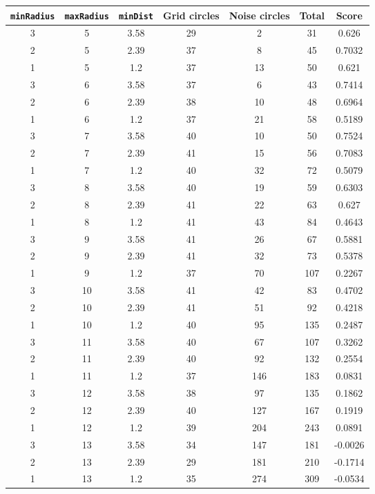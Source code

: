 \documentclass[letterpaper, 12pt]{article}
\begin{document}
\begin{longtable}{|c|c|c|c|c|c|c|}
\hline
\textbf{\texttt{minRadius}} & \textbf{\texttt{maxRadius}} & \textbf{\texttt{minDist}} & \textbf{Grid circles} & \textbf{Noise circles} & \textbf{Total} & \textbf{Score} \\
\hline
3 & 5 & 3.58 & 29 & 2 & 31 & 0.626 \\
\hline
2 & 5 & 2.39 & 37 & 8 & 45 & 0.7032 \\
\hline
1 & 5 & 1.2 & 37 & 13 & 50 & 0.621 \\
\hline
3 & 6 & 3.58 & 37 & 6 & 43 & 0.7414 \\
\hline
2 & 6 & 2.39 & 38 & 10 & 48 & 0.6964 \\
\hline
1 & 6 & 1.2 & 37 & 21 & 58 & 0.5189 \\
\hline
3 & 7 & 3.58 & 40 & 10 & 50 & 0.7524 \\
\hline
2 & 7 & 2.39 & 41 & 15 & 56 & 0.7083 \\
\hline
1 & 7 & 1.2 & 40 & 32 & 72 & 0.5079 \\
\hline
3 & 8 & 3.58 & 40 & 19 & 59 & 0.6303 \\
\hline
2 & 8 & 2.39 & 41 & 22 & 63 & 0.627 \\
\hline
1 & 8 & 1.2 & 41 & 43 & 84 & 0.4643 \\
\hline
3 & 9 & 3.58 & 41 & 26 & 67 & 0.5881 \\
\hline
2 & 9 & 2.39 & 41 & 32 & 73 & 0.5378 \\
\hline
1 & 9 & 1.2 & 37 & 70 & 107 & 0.2267 \\
\hline
3 & 10 & 3.58 & 41 & 42 & 83 & 0.4702 \\
\hline
2 & 10 & 2.39 & 41 & 51 & 92 & 0.4218 \\
\hline
1 & 10 & 1.2 & 40 & 95 & 135 & 0.2487 \\
\hline
3 & 11 & 3.58 & 40 & 67 & 107 & 0.3262 \\
\hline
2 & 11 & 2.39 & 40 & 92 & 132 & 0.2554 \\
\hline
1 & 11 & 1.2 & 37 & 146 & 183 & 0.0831 \\
\hline
3 & 12 & 3.58 & 38 & 97 & 135 & 0.1862 \\
\hline
2 & 12 & 2.39 & 40 & 127 & 167 & 0.1919 \\
\hline
1 & 12 & 1.2 & 39 & 204 & 243 & 0.0891 \\
\hline
3 & 13 & 3.58 & 34 & 147 & 181 & -0.0026 \\
\hline
2 & 13 & 2.39 & 29 & 181 & 210 & -0.1714 \\
\hline
1 & 13 & 1.2 & 35 & 274 & 309 & -0.0534 \\

\end{longtable}
\end{document}
